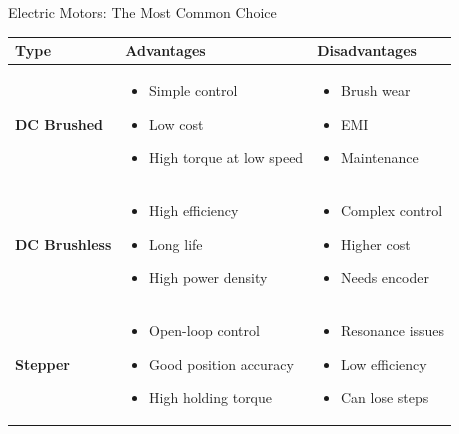 \documentclass[10pt]{beamer}
\begin{document}
\begin{frame}{Electric Motors: The Most Common Choice}
	\begin{table}[h]
		\centering
		\begin{tabular}{p{} p{} p{}}
			\toprule
			\textbf{Type} & \textbf{Advantages} & \textbf{Disadvantages} \\
			\midrule
			\textbf{DC Brushed} & 
			\begin{itemize}
				\footnotesize
				\item Simple control
				\item Low cost
				\item High torque at low speed
			\end{itemize} &
			\begin{itemize}
				\footnotesize
				\item Brush wear
				\item EMI
				\item Maintenance
			\end{itemize} \\
			
			\textbf{DC Brushless} &
			\begin{itemize}
				\footnotesize
				\item High efficiency
				\item Long life
				\item High power density
			\end{itemize} &
			\begin{itemize}
				\footnotesize
				\item Complex control
				\item Higher cost
				\item Needs encoder
			\end{itemize} \\
			
			\textbf{Stepper} &
			\begin{itemize}
				\footnotesize
				\item Open-loop control
				\item Good position accuracy
				\item High holding torque
			\end{itemize} &
			\begin{itemize}
				\footnotesize
				\item Resonance issues
				\item Low efficiency
				\item Can lose steps
			\end{itemize} \\
			\bottomrule
		\end{tabular}
	\end{table}
	

\end{frame}
\end{document}
